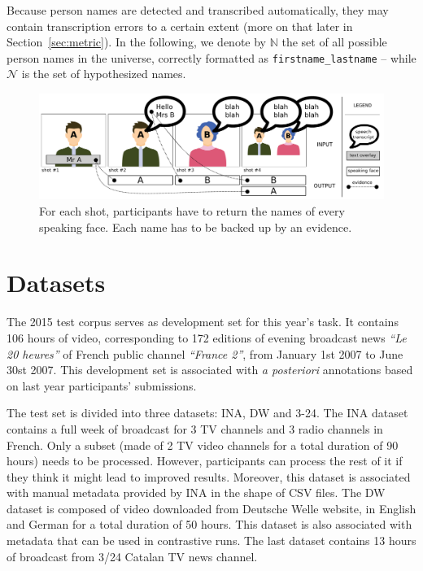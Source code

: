 \documentclass{acm_proc_article-me}
\newcommand\refNames{\mathbb{N}}
\newcommand\hypNames{\mathcal{N}}
\begin{document}
Because person names are detected and transcribed automatically, they may contain transcription errors to a certain extent (more on that later in Section~\ref{sec:metric}). In the following, we denote by $\refNames$ the set of all possible person names in the universe, correctly formatted as \texttt{firstname\_lastname} -- while $\hypNames$ is the set of hypothesized names.

\begin{figure}[!htb]
 \centering
 \includegraphics[width=1.\linewidth]{figs/evidence.pdf}
 \vspace{-0.5cm}
 \caption{For each shot, participants have to return the names of every speaking face. Each name has to be backed up by an evidence.}
 \label{fig:evidence}
\end{figure}

\vspace{-0.1cm}
\section{Datasets}

The 2015 test corpus serves as development set for this year's task. It contains 106 hours of video, corresponding to 172 editions of evening broadcast news \emph{``Le 20 heures''} of French public channel \emph{``France 2''}, from January 1st 2007 to June 30st 2007. This development set is associated with \emph{a posteriori} annotations based on last year participants' submissions. 

The test set is divided into three datasets: INA, DW and 3-24. The INA dataset contains a full week of broadcast for 3 TV channels and 3 radio channels in French. Only a subset (made of 2 TV video channels for a total duration of 90 hours) needs to be processed. However, participants can process the rest of it if they think it might lead to improved results. Moreover, this dataset is associated with manual metadata provided by INA in the shape of CSV files. The DW dataset is composed of video downloaded from Deutsche Welle website, in English and German for a total duration of 50 hours. This dataset is also associated with metadata that can be used in contrastive runs. The last dataset contains 13 hours of broadcast from 3/24 Catalan TV news channel.
\end{document}
